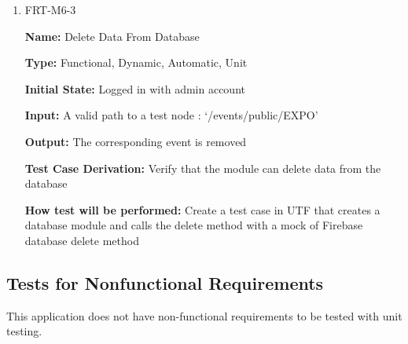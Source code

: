 \documentclass[12pt, titlepage]{article}
\begin{document}
\begin{enumerate}
\item{FRT-M6-3}

\textbf{Name:} Delete Data From Database

\textbf{Type:} Functional, Dynamic, Automatic, Unit
					
\textbf{Initial State:} Logged in with admin account
					
\textbf{Input:} A valid path to a test node : `/events/public/EXPO'

\textbf{Output:} The corresponding event is removed

\textbf{Test Case Derivation:} Verify that the module can delete data from the database

\textbf{How test will be performed:} Create a test case in UTF that creates a database module and calls the delete method with a mock of Firebase database delete method
\end{enumerate}

\subsection{Tests for Nonfunctional Requirements}

This application does not have non-functional requirements to be tested with unit testing.  
\end{document}
